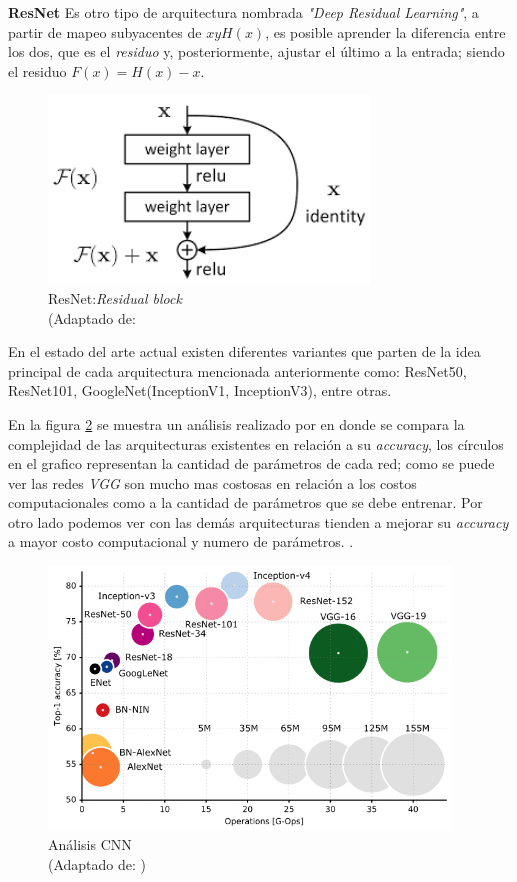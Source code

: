 \par \textbf{ResNet} \citep{resnet_a} Es otro tipo de arquitectura nombrada \textit{"Deep Residual Learning"}, a partir de mapeo subyacentes de $x y H (x)$, es posible aprender la diferencia entre los dos, que es el \textit{residuo} y, posteriormente, ajustar el último a la entrada; siendo el residuo $F(x) = H(x) - x$.

\begin{figure}[H]
 \centering
  \includegraphics[height=5cm,keepaspectratio=true,clip=true]{imagenes/MarcoTeorico/resnet.png}
  \caption{ResNet:\textit{Residual block} \\(Adaptado de: \citep{resnet_a}}
	\label{Fig:inception}
\end{figure}


En el estado del arte actual existen diferentes variantes que parten de la idea principal de cada arquitectura mencionada anteriormente como: ResNet50, ResNet101, GoogleNet(InceptionV1, InceptionV3), entre otras. 

En la  figura \ref{Fig:cnn-analisis} se muestra un análisis realizado por \cite{Analysis_deep_network} en donde se compara la complejidad de las arquitecturas existentes en relación a su \textit{accuracy}, los círculos en el grafico representan la cantidad de parámetros de cada red; como se puede ver las redes \textit{VGG} son mucho mas costosas en relación a los costos computacionales como a la cantidad de parámetros que se debe entrenar. Por otro lado podemos ver con las demás arquitecturas tienden a mejorar su \textit{accuracy} a mayor costo computacional y numero de parámetros.
.

\begin{figure}[H]
 \centering
  \includegraphics[height=7cm,keepaspectratio=true,clip=true]{imagenes/MarcoTeorico/cnn-analisis.png}
  \caption{Análisis CNN \\ (Adaptado de: \citep{cazani_grap})}
	\label{Fig:cnn-analisis}
\end{figure}




